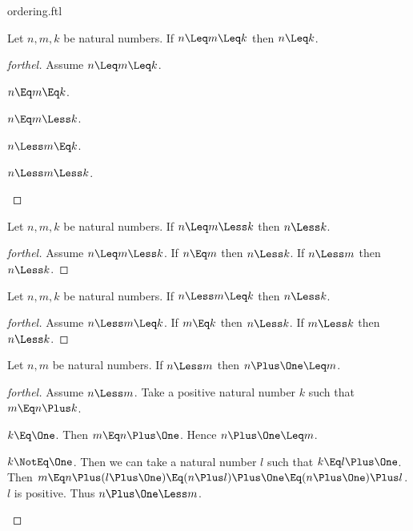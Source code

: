 \documentclass{stex}
\begin{document}
\begin{smodule}{ordering.ftl}
\begin{proposition*}[forthel]
  Let $n, m, k$ be natural numbers.
  If $n \Leq m \Leq k$ then $n \Leq k$.
\end{proposition*}
\begin{proof}[forthel]
  Assume $n \Leq m \Leq k$.
  \begin{case}{$n \Eq m \Eq k$.} \end{case}
  \begin{case}{$n \Eq m \Less k$.} \end{case}
  \begin{case}{$n \Less m \Eq k$.} \end{case}
  \begin{case}{$n \Less m \Less k$.} \end{case}
\end{proof}

\begin{proposition*}[forthel]
  Let $n, m, k$ be natural numbers.
  If $n \Leq m \Less k$ then $n \Less k$.
\end{proposition*}
\begin{proof}[forthel]
  Assume $n \Leq m \Less k$.
  If $n \Eq m$ then $n \Less k$.
  If $n \Less m$ then $n \Less k$.
\end{proof}

\begin{proposition*}[forthel]
  Let $n, m, k$ be natural numbers.
  If $n \Less m \Leq k$ then $n \Less k$.
\end{proposition*}
\begin{proof}[forthel]
  Assume $n \Less m \Leq k$.
  If $m \Eq k$ then $n \Less k$.
  If $m \Less k$ then $n \Less k$.
\end{proof}

\begin{proposition*}[forthel]
  Let $n, m$ be natural numbers.
  If $n \Less m$ then $n \Plus \One \Leq m$.
\end{proposition*}
\begin{proof}[forthel]
  Assume $n \Less m$.
  Take a positive natural number $k$ such that $m \Eq n \Plus k$.

  \begin{case}{$k \Eq \One$.}
    Then $m \Eq n \Plus \One$.
    Hence $n \Plus \One \Leq m$.
  \end{case}

  \begin{case}{$k \NotEq \One$.}
    Then we can take a natural number $l$ such that $k \Eq l \Plus \One$.
    Then $m
      \Eq n \Plus (l \Plus \One)
      \Eq (n \Plus l) \Plus \One
      \Eq (n \Plus \One) \Plus l$.
    $l$ is positive.
    Thus $n \Plus \One \Less m$.
  \end{case}
\end{proof}


\end{smodule}
\end{document}
